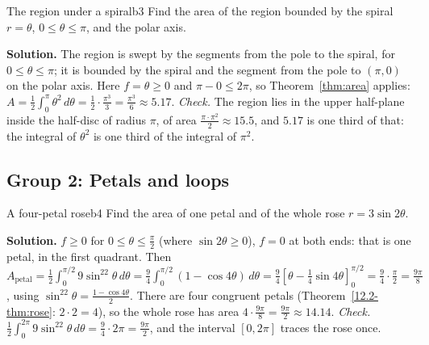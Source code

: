 \documentclass[11pt]{article}
\begin{document}
\begin{exmp}{The region under a spiral}{b3}
Find the area of the region bounded by the spiral $r=\theta$, $0\le\theta\le\pi$, and the polar axis.

\textbf{Solution.} The region is swept by the segments from the pole to the spiral, for $0\le\theta\le\pi$; it is bounded by the spiral and the segment from the pole to $(\pi,0)$ on the polar axis. Here $f=\theta\ge0$ and $\pi-0\le2\pi$, so Theorem~\ref{thm:area} applies: $A=\frac12\int_0^\pi\theta^2\,d\theta=\frac12\cdot\frac{\pi^3}3=\frac{\pi^3}6\approx5.17$. \emph{Check.} The region lies in the upper half-plane inside the half-disc of radius $\pi$, of area $\frac{\pi\cdot\pi^2}2\approx15.5$, and $5.17$ is one third of that: the integral of $\theta^2$ is one third of the integral of $\pi^2$.
\end{exmp}

\subsection*{Group 2: Petals and loops}

\begin{exmp}{A four-petal rose}{b4}
Find the area of one petal and of the whole rose $r=3\sin2\theta$.

\textbf{Solution.} $f\ge0$ for $0\le\theta\le\frac\pi2$ (where $\sin2\theta\ge0$), $f=0$ at both ends: that is one petal, in the first quadrant. Then $A_{\text{petal}}=\frac12\int_0^{\pi/2}9\sin^22\theta\,d\theta=\frac94\int_0^{\pi/2}(1-\cos4\theta)\,d\theta=\frac94\left[\theta-\frac14\sin4\theta\right]_0^{\pi/2}=\frac94\cdot\frac\pi2=\frac{9\pi}8$, using $\sin^22\theta=\frac{1-\cos4\theta}2$. There are four congruent petals (Theorem~\ref{12.2-thm:rose}: $2\cdot2=4$), so the whole rose has area $4\cdot\frac{9\pi}8=\frac{9\pi}2\approx14.14$. \emph{Check.} $\frac12\int_0^{2\pi}9\sin^22\theta\,d\theta=\frac94\cdot2\pi=\frac{9\pi}2$, and the interval $[0,2\pi]$ traces the rose once.
\end{exmp}
\end{document}
